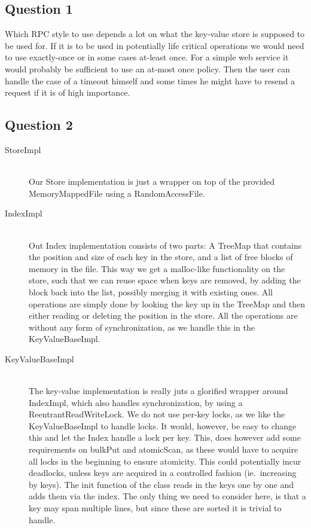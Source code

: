 \documentclass[a4paper,final]{article}
\newcommand{\mono}[1]{{\ttfamily#1}}
\begin{document}
\subsection*{Question 1}
Which RPC style to use depends a lot on what the key-value store is supposed
to be used for. If it is to be used in potentially life critical operations
we would need to use exactly-once or in some cases at-least once. For a simple
web service it would probably be sufficient to use an at-most once policy.
Then the user can handle the case of a timeout himself and some times he might
have to resend a request if it is of high importance.

\subsection*{Question 2}

\begin{description}
    \item [\mono{StoreImpl}]\ \\
        Our Store implementation is just a wrapper on top of the provided
        \mono{MemoryMappedFile} using a \mono{RandomAccessFile}.
    \item [\mono{IndexImpl}]\ \\
        Out Index implementation consists of two parts: A \mono{TreeMap} that
        contains the position and size of each key in the store, and a list
        of free blocks of memory in the file. This way we get a
        \mono{malloc}-like functionality on the store, such that we can reuse
        space when keys are removed, by adding the block back into the list,
        possibly merging it with existing ones. All operations are simply done
        by looking the key up in the \mono{TreeMap} and then either reading or
        deleting the position in the store. All the operations are without any
        form of synchronization, as we handle this in the
        \mono{KeyValueBaseImpl}.
    \item [\mono{KeyValueBaseImpl}]\ \\
        The key-value implementation is really juts a glorified wrapper around
        \mono{IndexImpl}, which also handles synchronization, by using a
        \mono{ReentrantReadWriteLock}. We do not use per-key locks, as we like
        the \mono{KeyValueBaseImpl} to handle locks. It would, however, be easy
        to change this and let the Index handle a lock per key. This, does
        however add some requirements on \mono{bulkPut} and \mono{atomicScan},
        as these would have to acquire all locks in the beginning to ensure
        atomicity. This could potentially incur deadlocks, unless keys are
        acquired in a controlled fashion (ie.~increasing by keys).
        The \mono{init} function of the class reads in the keys one by one
        and adds them via the index. The only thing we need to consider here,
        is that a key may span multiple lines, but since these are sorted it
        is trivial to handle.
\end{description}
\end{document}
